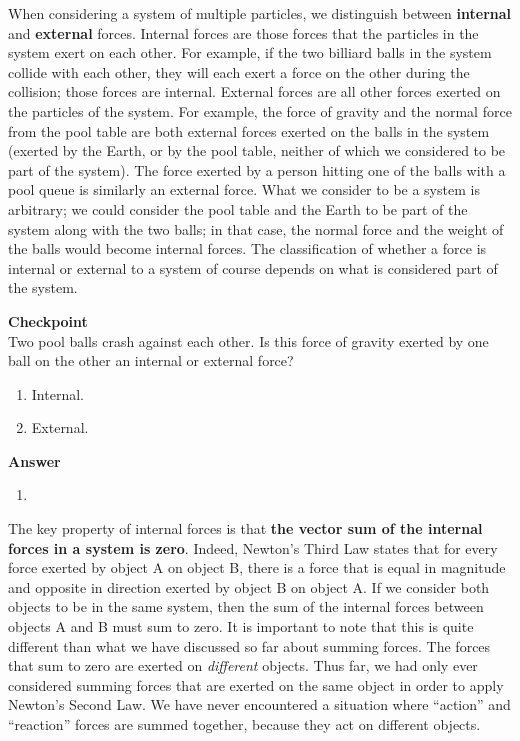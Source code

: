 \documentclass[9pt,arxiv,red]{lapreprint}
\begin{document}
When considering a system of multiple particles, we distinguish between \textbf{internal} and \textbf{external} forces. Internal forces are those forces that the particles in the system exert on each other. For example, if the two billiard balls in the system collide with each other, they will each exert a force on the other during the collision; those forces are internal. External forces are all other forces exerted on the particles of the system. For example, the force of gravity and the normal force from the pool table are both external forces exerted on the balls in the system (exerted by the Earth, or by the pool table, neither of which we considered to be part of the system). The force exerted by a person hitting one of the balls with a pool queue is similarly an external force. What we consider to be a system is arbitrary; we could consider the pool table and the Earth to be part of the system along with the two balls; in that case, the normal force and the weight of the balls would become internal forces. The classification of whether a force is internal or external to a system of course depends on what is considered part of the system.

\begin{framed}
\textbf{Checkpoint}\\
Two pool balls crash against each other. Is this force of gravity exerted by one ball on the other an internal or external force?

\begin{enumerate}
\item Internal.
\item External.
\end{enumerate}

\begin{framed}
\textbf{Answer}\\
\begin{enumerate}
\item
\end{enumerate}
\end{framed}
\end{framed}

The key property of internal forces is that \textbf{the vector sum of the internal forces in a system is zero}. Indeed, Newton's Third Law states that for every force exerted by object A on object B, there is a force that is equal in magnitude and opposite in direction exerted by object B on object A. If we consider both objects to be in the same system, then the sum of the internal forces between objects A and B must sum to zero. It is important to note that this is quite different than what we have discussed so far about summing forces. The forces that sum to zero are exerted on \textit{different} objects. Thus far, we had only ever considered summing forces that are exerted on the same object in order to apply Newton's Second Law. We have never encountered a situation where ``action'' and ``reaction'' forces are summed together, because they act on different objects.
\end{document}

